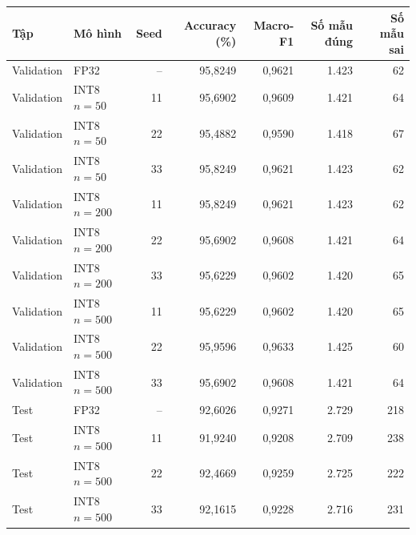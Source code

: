 \begin{tabular}{llrrrrr}
\toprule
Tập & Mô hình & Seed & Accuracy (\%) & Macro-F1 & Số mẫu đúng & Số mẫu sai \\
\midrule
Validation & FP32 & -- & 95,8249 & 0,9621 & 1.423 & 62 \\
Validation & INT8 $n=50$ & 11 & 95,6902 & 0,9609 & 1.421 & 64 \\
Validation & INT8 $n=50$ & 22 & 95,4882 & 0,9590 & 1.418 & 67 \\
Validation & INT8 $n=50$ & 33 & 95,8249 & 0,9621 & 1.423 & 62 \\
Validation & INT8 $n=200$ & 11 & 95,8249 & 0,9621 & 1.423 & 62 \\
Validation & INT8 $n=200$ & 22 & 95,6902 & 0,9608 & 1.421 & 64 \\
Validation & INT8 $n=200$ & 33 & 95,6229 & 0,9602 & 1.420 & 65 \\
Validation & INT8 $n=500$ & 11 & 95,6229 & 0,9602 & 1.420 & 65 \\
Validation & INT8 $n=500$ & 22 & 95,9596 & 0,9633 & 1.425 & 60 \\
Validation & INT8 $n=500$ & 33 & 95,6902 & 0,9608 & 1.421 & 64 \\
\midrule
Test & FP32 & -- & 92,6026 & 0,9271 & 2.729 & 218 \\
Test & INT8 $n=500$ & 11 & 91,9240 & 0,9208 & 2.709 & 238 \\
Test & INT8 $n=500$ & 22 & 92,4669 & 0,9259 & 2.725 & 222 \\
Test & INT8 $n=500$ & 33 & 92,1615 & 0,9228 & 2.716 & 231 \\
\bottomrule
\end{tabular}
